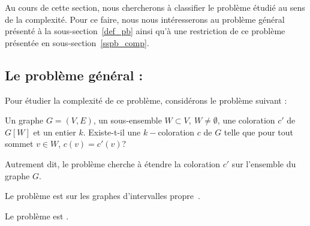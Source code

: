 Au cours de cette section, nous chercherons à classifier le problème étudié au sens de la
complexité. Pour ce faire, nous nous intéresserons au problème général présenté à la
sous-section~\ref{def_pb} ainsi qu'à une restriction de ce problème présentée en
sous-section~\ref{sspb_comp}.

\subsection{Le problème général : \fischedpi{}}

Pour étudier la complexité de ce problème, considérons le problème suivant :

\dfdec{\precolor{}}
{Un graphe $G=(V, E)$, un sous-ensemble $W \subset V,\ W \neq \emptyset$, une coloration $c'$ de $G[W]$ et un
entier $k$.}
{Existe-t-il une $k-$coloration $c$ de $G$ telle que pour tout sommet $v \in W$, $c(v) =
c'(v)$?}

Autrement dit, le problème \precolor{} cherche à étendre la coloration $c'$ sur l'ensemble du graphe
$G$.

\begin{nthrm}
    Le problème \precolor{} est \npc{} sur les graphes d'intervalles
    propre~\cite{marx2006precoloring}.
\end{nthrm}

\begin{nthrm}
    Le problème \fischedpi{} est \npc{}.
\end{nthrm}

